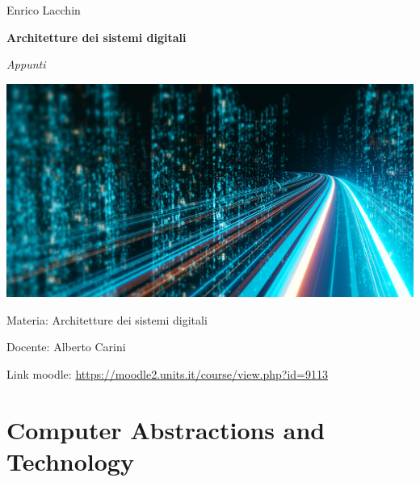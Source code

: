 \documentclass[12pt,a4paper]{article}
\begin{document}

\small{Enrico Lacchin}

\MidSep
\textbf{\LARGE{Architetture dei sistemi digitali}}

\MidSep
\textit{\Large{Appunti}}
\Sep

\begin{center}
\includegraphics[width=1\columnwidth]{img/architetture.jpeg}
\end{center}

\vfill
Materia: Architetture dei sistemi digitali

Docente: Alberto Carini

Link moodle: \url{https://moodle2.units.it/course/view.php?id=9113}


\clearpage
{}
\setcounter{page}{1}
\tableofcontents

\clearpage

\setcounter{page}{1}

\section{Computer Abstractions and Technology}
\end{document}
